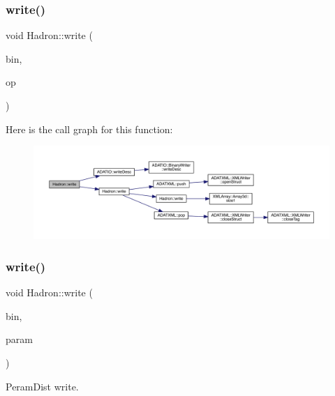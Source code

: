 \subsubsection{\texorpdfstring{write()}{write()}\hspace{0.1cm}{\footnotesize\ttfamily [73/95]}}
{\footnotesize\ttfamily void Hadron\+::write (\begin{DoxyParamCaption}\item[{\mbox{\hyperlink{classADATIO_1_1BinaryWriter}{Binary\+Writer}} \&}]{bin,  }\item[{const \mbox{\hyperlink{structHadron_1_1HadronVertex__t}{Hadron\+Vertex\+\_\+t}} \&}]{op }\end{DoxyParamCaption})}

Here is the call graph for this function\+:
\nopagebreak
\begin{figure}[H]
\begin{center}
\leavevmode
\includegraphics[width=350pt]{d1/daf/namespaceHadron_a6d8b26c4e0e11ca4b20e046f2595326e_cgraph}
\end{center}
\end{figure}
\mbox{\label{namespaceHadron_afebbe26d622d0f830042509739bee2da}} 
\subsubsection{\texorpdfstring{write()}{write()}\hspace{0.1cm}{\footnotesize\ttfamily [74/95]}}
{\footnotesize\ttfamily void Hadron\+::write (\begin{DoxyParamCaption}\item[{\mbox{\hyperlink{classADATIO_1_1BinaryWriter}{Binary\+Writer}} \&}]{bin,  }\item[{const \mbox{\hyperlink{structHadron_1_1ValPeramDist__t}{Val\+Peram\+Dist\+\_\+t}} \&}]{param }\end{DoxyParamCaption})}



Peram\+Dist write. 

